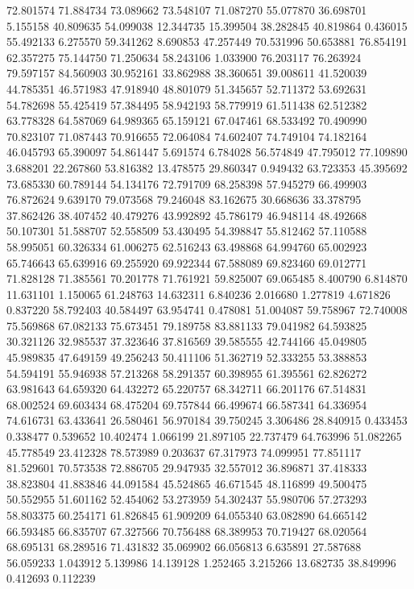 72.801574
71.884734
73.089662
73.548107
71.087270
55.077870
36.698701
5.155158
40.809635
54.099038
12.344735
15.399504
38.282845
40.819864
0.436015
55.492133
6.275570
59.341262
8.690853
47.257449
70.531996
50.653881
76.854191
62.357275
75.144750
71.250634
58.243106
1.033900
76.203117
76.263924
79.597157
84.560903
30.952161
33.862988
38.360651
39.008611
41.520039
44.785351
46.571983
47.918940
48.801079
51.345657
52.711372
53.692631
54.782698
55.425419
57.384495
58.942193
58.779919
61.511438
62.512382
63.778328
64.587069
64.989365
65.159121
67.047461
68.533492
70.490990
70.823107
71.087443
70.916655
72.064084
74.602407
74.749104
74.182164
46.045793
65.390097
54.861447
5.691574
6.784028
56.574849
47.795012
77.109890
3.688201
22.267860
53.816382
13.478575
29.860347
0.949432
63.723353
45.395692
73.685330
60.789144
54.134176
72.791709
68.258398
57.945279
66.499903
76.872624
9.639170
79.073568
79.246048
83.162675
30.668636
33.378795
37.862426
38.407452
40.479276
43.992892
45.786179
46.948114
48.492668
50.107301
51.588707
52.558509
53.430495
54.398847
55.812462
57.110588
58.995051
60.326334
61.006275
62.516243
63.498868
64.994760
65.002923
65.746643
65.639916
69.255920
69.922344
67.588089
69.823460
69.012771
71.828128
71.385561
70.201778
71.761921
59.825007
69.065485
8.400790
6.814870
11.631101
1.150065
61.248763
14.632311
6.840236
2.016680
1.277819
4.671826
0.837220
58.792403
40.584497
63.954741
0.478081
51.004087
59.758967
72.740008
75.569868
67.082133
75.673451
79.189758
83.881133
79.041982
64.593825
30.321126
32.985537
37.323646
37.816569
39.585555
42.744166
45.049805
45.989835
47.649159
49.256243
50.411106
51.362719
52.333255
53.388853
54.594191
55.946938
57.213268
58.291357
60.398955
61.395561
62.826272
63.981643
64.659320
64.432272
65.220757
68.342711
66.201176
67.514831
68.002524
69.603434
68.475204
69.757844
66.499674
66.587341
64.336954
74.616731
63.433641
26.580461
56.970184
39.750245
3.306486
28.840915
0.433453
0.338477
0.539652
10.402474
1.066199
21.897105
22.737479
64.763996
51.082265
45.778549
23.412328
78.573989
0.203637
67.317973
74.099951
77.851117
81.529601
70.573538
72.886705
29.947935
32.557012
36.896871
37.418333
38.823804
41.883846
44.091584
45.524865
46.671545
48.116899
49.500475
50.552955
51.601162
52.454062
53.273959
54.302437
55.980706
57.273293
58.803375
60.254171
61.826845
61.909209
64.055340
63.082890
64.665142
66.593485
66.835707
67.327566
70.756488
68.389953
70.719427
68.020564
68.695131
68.289516
71.431832
35.069902
66.056813
6.635891
27.587688
56.059233
1.043912
5.139986
14.139128
1.252465
3.215266
13.682735
38.849996
0.412693
0.112239
